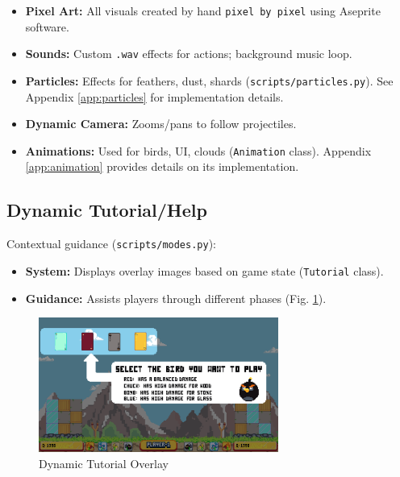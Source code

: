 \documentclass[11pt, a4paper]{article}
\begin{document}
\begin{itemize}

    \item \textbf{Pixel Art:} All visuals created by hand \texttt{pixel by pixel} using Aseprite software.
    
    \item \textbf{Sounds:} Custom \texttt{.wav} effects for actions; background music loop.
    
    \item \textbf{Particles:} Effects for feathers, dust, shards (\texttt{scripts/particles.py}). See Appendix \ref{app:particles} for implementation details.
    
    \item \textbf{Dynamic Camera:} Zooms/pans to follow projectiles.
    
    \item \textbf{Animations:} Used for birds, UI, clouds (\texttt{Animation} class). Appendix \ref{app:animation} provides details on its implementation.

\end{itemize}

\vspace{1cm}

\subsection{Dynamic Tutorial/Help}

Contextual guidance (\texttt{scripts/modes.py}):

\begin{itemize}

    \item \textbf{System:} Displays overlay images based on game state (\texttt{Tutorial} class).
    
    \item \textbf{Guidance:} Assists players through different phases (Fig. \ref{fig:tutorial_a}).

\end{itemize}

\begin{figure}[h!]

    \centering
    
    \includegraphics[width=0.7\textwidth]{images/tutorial.png}
    
    \caption{Dynamic Tutorial Overlay}
    
    \label{fig:tutorial_a}

\end{figure}
\end{document}
